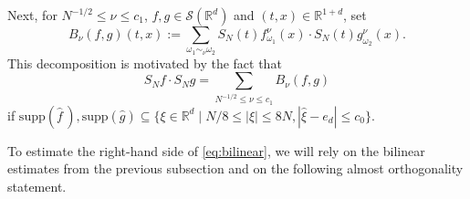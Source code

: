 \documentclass{amsart}
\numberwithin{equation}{section}
\theoremstyle{definition}
\newcommand{\R}{\mathbb{R}}
\newcommand{\Rd}{\mathbb{R}^{d}}
\newcommand{\Rn}{\mathbb{R}^{d}}
\newcommand {\Sw}{\mathcal{S}}
\newcommand {\supp}{\mathrm{supp}}
\newcommand {\w}{\omega}
\newcommand {\wh}{\widehat}
\begin{document}
Next, for $N^{-1/2}\leq \nu\leq c_{1}$, $f,g\in\Sw(\Rd)$ and $(t,x)\in\R^{1+d}$, set
\begin{equation}\label{eq:Bnu}
B_{\nu}(f,g)(t,x):=\sum_{\w_{1}\sim_{\nu}\w_{2}}S_{N}(t)f^{\nu}_{\w_{1}}(x)\cdot S_{N}(t)g^{\nu}_{\w_{2}}(x).
\end{equation}
This decomposition is motivated by the fact that 
\begin{equation}\label{eq:bilinear}
S_{N}f\cdot S_{N}g=\sum_{N^{-1/2}\leq \nu\leq c_{1}}B_{\nu}(f,g)
\end{equation}
if 
$\supp(\wh{f}\,),\supp(\wh{g})\subseteq \{\xi\in\Rn\mid N/8\leq |\xi|\leq 8N, |\hat{\xi}-e_{d}|\leq c_{0}\}$.

To estimate the right-hand side of \eqref{eq:bilinear}, we will rely on the bilinear estimates from the previous subsection and on the following almost orthogonality statement.
\end{document}
